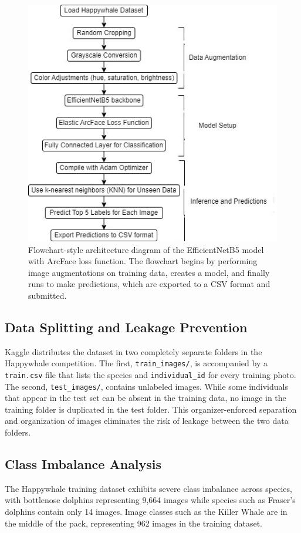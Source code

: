 \documentclass[twocolumn]{article}
\begin{document}
\begin{figure}
    \centering
    \includegraphics[width=0.7\linewidth]{model3.jpg}
    \caption{Flowchart-style architecture diagram of the EfficientNetB5 model with ArcFace loss function. The flowchart begins by performing image augmentations on training data, creates a model, and finally runs to make predictions, which are exported to a CSV format and submitted.}
\end{figure}

\subsection{Data Splitting and Leakage Prevention}

Kaggle distributes the dataset in two completely separate folders in the Happywhale competition. The first, \texttt{train\_images/}, is accompanied by a \texttt{train.csv} file that lists the species and \texttt{individual_id} for every training photo. The second, \texttt{test_images/}, contains unlabeled images. While some individuals that appear in the test set can be absent in the training data, no image in the training folder is duplicated in the test folder. This organizer-enforced separation and organization of images eliminates the risk of leakage between the two data folders.  

\subsection{Class Imbalance Analysis}

The Happywhale training dataset exhibits severe class imbalance across species, with bottlenose dolphins representing 9,664 images while species such as Fraser's dolphins contain only 14 images.  Image classes such as the Killer Whale are in the middle of the pack, representing 962 images in the training dataset. 
\end{document}

